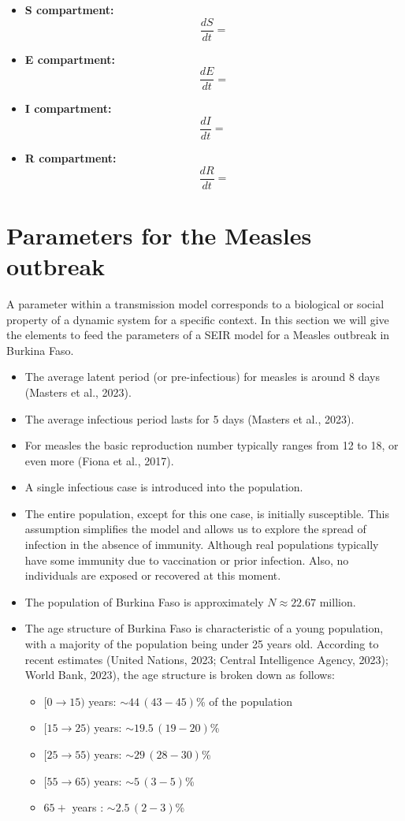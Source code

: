 \documentclass{article}
\begin{document}
\begin{itemize}
    \item \textbf{S compartment:}
    \[
    \frac{dS}{dt} =
    \]

    \item \textbf{E compartment:}
    \[
    \frac{dE}{dt} =
    \]
    \item \textbf{I compartment:}
    \[
    \frac{dI}{dt} = \
    \]

    \item \textbf{R compartment:}
    \[
    \frac{dR}{dt} =
    \]
\end{itemize}

\section{Parameters for the Measles outbreak}
A parameter within a transmission model
corresponds to a biological or social property of a dynamic system
for a specific context.
In this section we will give the elements to feed the parameters
of a SEIR model for a Measles outbreak in Burkina Faso.
\begin{itemize}
	\item The average latent period (or pre-infectious) for measles is
	around 8 days (Masters et al., 2023).
	\item The average infectious period lasts for 5 days (Masters et al., 2023).
	\item For measles the basic reproduction number typically ranges
	from 12 to 18, or even more (Fiona et al., 2017).
	\item A single infectious case is introduced into the population.
	\item The entire population, except for this one case, is initially susceptible.
	This assumption simplifies the model and allows us to explore the spread of
	infection in the absence of immunity. Although real populations typically
	have some immunity due to vaccination or prior infection.
	Also, no individuals are exposed or recovered at this moment.
	\item The population of Burkina Faso is approximately $N\approx 22.67$ million.
	\item The age structure of Burkina Faso is characteristic of a young
	population, with a majority of the population being under 25 years old.
	According to recent estimates (United Nations, 2023;
	Central Intelligence Agency, 2023); World Bank, 2023),
	the age structure is broken down as follows:

	\begin{itemize}
	\item $[0\to15)$ years: $\sim 44 \, (43-45)$\% of the population
	\item $[15\to 25)$ years: $\sim 19.5 \, (19-20)$\%
	\item $[25\to 55)$ years: $\sim 29 \, (28-30)$\%
	\item $[55\to 65)$ years: $\sim 5 \, (3-5)$\%
	\item $65+$ years : $\sim 2.5 \, (2-3)$\%
	\end{itemize}

\end{itemize}
\end{document}
